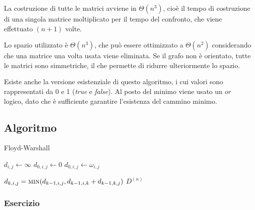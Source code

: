 La costruzione di tutte le matrici avviene in $\Theta(n^3)$, cioè il tempo di costruzione di una singola matrice moltiplicato per il tempo del confronto, che viene effettuato $(n + 1)$ volte. 

Lo spazio utilizzato è $\Theta(n^3)$, che può essere ottimizzato a $\Theta(n^2)$ considerando che una matrice una volta usata viene eliminata. Se il grafo non è orientato, tutte le matrici sono simmetriche, il che permette di ridurre ulteriormente lo spazio. 

Esiste anche la versione esistenziale di questo algoritmo, i cui valori sono rappresentati da 0 e 1 (\textit{true} e \textit{false}). Al posto del minimo viene usato un $or$ logico, dato che è sufficiente garantire l'esistenza del cammino minimo.

\subsection{Algoritmo}

\begin{algorithm}[H]
    \caption{Floyd-Warshall}
    \begin{algorithmic}
                        \State $d_{i,j} \gets \infty$
                    \Else
                            \State $d_{0,i,j} \gets 0$
                        \Else
                            \State $d_{0,i,j} \gets \omega_{i,j}$
                        \EndIf
                    \EndIf
                \EndFor
            \EndFor

                        \State $d_{k,i,j} = \Call{min}{d_{k-1,i,j}, d_{k-1,i,k} + d_{k - 1,k,j}}$
                    \EndFor
                \EndFor
            \EndFor
            \State \Return $D^{(n)}$
        \EndFunction
    \end{algorithmic}
\end{algorithm}

\subsubsection{Esercizio}

